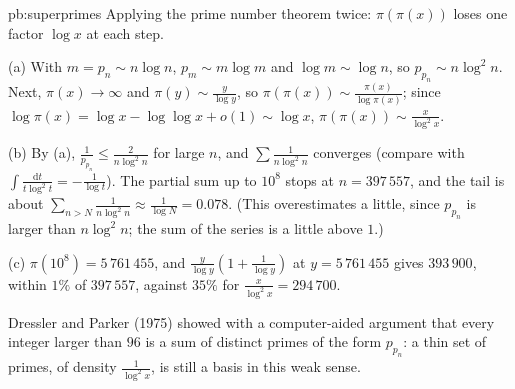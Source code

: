 \begin{solution}{pb:superprimes}
\idea Applying the prime number theorem twice: $\pi(\pi(x))$ loses one factor $\log x$ at each step.

\writeup (a) With $m=p_n\sim n\log n$, $p_m\sim m\log m$ and $\log m\sim\log n$, so $p_{p_n}\sim n\log^2n$. Next, $\pi(x)\to\infty$ and $\pi(y)\sim\frac y{\log y}$, so
$\pi(\pi(x))\sim\frac{\pi(x)}{\log\pi(x)}$; since $\log\pi(x)=\log x-\log\log x+o(1)\sim\log x$, $\pi(\pi(x))\sim\frac x{\log^2x}$.

(b) By (a), $\frac1{p_{p_n}}\le\frac2{n\log^2n}$ for large $n$, and $\sum\frac1{n\log^2n}$ converges (compare with $\int\frac{\mathrm dt}{t\log^2t}=-\frac1{\log t}$). The partial sum up to $10^8$ stops at
$n=397\,557$, and the tail is about $\sum_{n>N}\frac1{n\log^2n}\approx\frac1{\log N}=0.078$. (This overestimates a little, since $p_{p_n}$ is larger than $n\log^2n$; the sum
of the series is a little above $1$.)

(c) $\pi(10^8)=5\,761\,455$, and $\frac y{\log y}(1+\frac1{\log y})$ at $y=5\,761\,455$ gives $393\,900$, within $1\%$ of $397\,557$, against $35\%$ for $\frac x{\log^2x}=294\,700$.

\leads Dressler and Parker (1975) showed with a computer-aided argument that every integer larger than $96$ is a sum of distinct primes of the form $p_{p_n}$: a thin set of primes,
of density $\frac1{\log^2x}$, is still a basis in this weak sense.
\end{solution}

